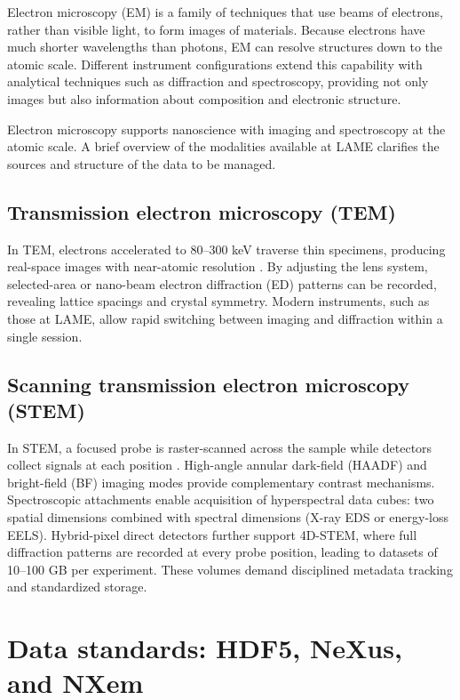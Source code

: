 Electron microscopy (EM) is a family of techniques that use beams of electrons, rather than visible light, to form images of materials. 
Because electrons have much shorter wavelengths than photons, EM can resolve structures down to the atomic scale. 
Different instrument configurations extend this capability with analytical techniques such as diffraction and spectroscopy, providing not only images but also information about composition and electronic structure.  

Electron microscopy supports nanoscience with imaging and spectroscopy at the atomic scale. 
A brief overview of the modalities available at LAME clarifies the sources and structure of the data to be managed.


\subsection{Transmission electron microscopy (TEM)}

In TEM, electrons accelerated to 80--300 keV traverse thin specimens, producing real-space images with near-atomic resolution \parencite{EMoverview}. 
By adjusting the lens system, selected-area or nano-beam electron diffraction (ED) patterns can be recorded, revealing lattice spacings and crystal symmetry. 
Modern instruments, such as those at LAME, allow rapid switching between imaging and diffraction within a single session.

\subsection{Scanning transmission electron microscopy (STEM)}

In STEM, a focused probe is raster-scanned across the sample while detectors collect signals at each position \parencite{EMoverview}. 
High-angle annular dark-field (HAADF) and bright-field (BF) imaging modes provide complementary contrast mechanisms. 
Spectroscopic attachments enable acquisition of hyperspectral data cubes: two spatial dimensions combined with spectral dimensions (X-ray EDS or energy-loss EELS). 
Hybrid-pixel direct detectors further support 4D-STEM, where full diffraction patterns are recorded at every probe position, leading to datasets of 10–100 GB per experiment. 
These volumes demand disciplined metadata tracking and standardized storage.

\section{Data standards: HDF5, NeXus, and NXem}\label{sec:nexus-format}


